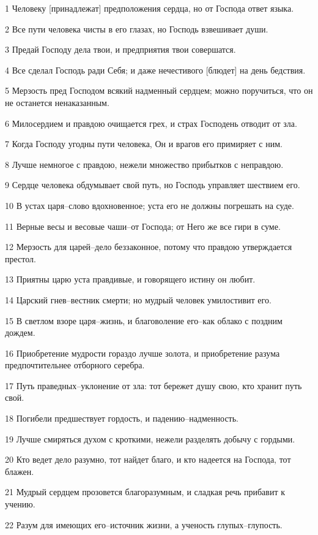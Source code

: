 \par 1 Человеку [принадлежат] предположения сердца, но от Господа ответ языка.
\par 2 Все пути человека чисты в его глазах, но Господь взвешивает души.
\par 3 Предай Господу дела твои, и предприятия твои совершатся.
\par 4 Все сделал Господь ради Себя; и даже нечестивого [блюдет] на день бедствия.
\par 5 Мерзость пред Господом всякий надменный сердцем; можно поручиться, что он не останется ненаказанным.
\par 6 Милосердием и правдою очищается грех, и страх Господень отводит от зла.
\par 7 Когда Господу угодны пути человека, Он и врагов его примиряет с ним.
\par 8 Лучше немногое с правдою, нежели множество прибытков с неправдою.
\par 9 Сердце человека обдумывает свой путь, но Господь управляет шествием его.
\par 10 В устах царя--слово вдохновенное; уста его не должны погрешать на суде.
\par 11 Верные весы и весовые чаши--от Господа; от Него же все гири в суме.
\par 12 Мерзость для царей--дело беззаконное, потому что правдою утверждается престол.
\par 13 Приятны царю уста правдивые, и говорящего истину он любит.
\par 14 Царский гнев--вестник смерти; но мудрый человек умилостивит его.
\par 15 В светлом взоре царя--жизнь, и благоволение его--как облако с поздним дождем.
\par 16 Приобретение мудрости гораздо лучше золота, и приобретение разума предпочтительнее отборного серебра.
\par 17 Путь праведных--уклонение от зла: тот бережет душу свою, кто хранит путь свой.
\par 18 Погибели предшествует гордость, и падению--надменность.
\par 19 Лучше смиряться духом с кроткими, нежели разделять добычу с гордыми.
\par 20 Кто ведет дело разумно, тот найдет благо, и кто надеется на Господа, тот блажен.
\par 21 Мудрый сердцем прозовется благоразумным, и сладкая речь прибавит к учению.
\par 22 Разум для имеющих его--источник жизни, а ученость глупых--глупость.
